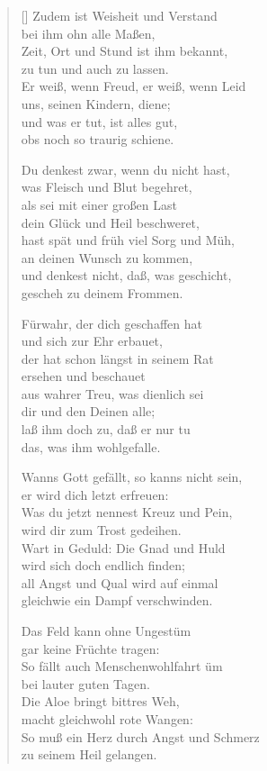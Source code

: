 \begin{multicols}{2}
\begin{verse}[\versewidth]
 Zudem ist Weisheit und Verstand\\
bei ihm ohn alle Maßen,\\
Zeit, Ort und Stund ist ihm bekannt,\\
zu tun und auch zu lassen.\\
Er weiß, wenn Freud, er weiß, wenn Leid\\
uns, seinen Kindern, diene;\\
und was er tut, ist alles gut,\\
obs noch so traurig schiene.

 Du denkest zwar, wenn du nicht hast,\\
was Fleisch und Blut begehret,\\
als sei mit einer großen Last\\
dein Glück und Heil beschweret,\\
hast spät und früh viel Sorg und Müh,\\
an deinen Wunsch zu kommen,\\
und denkest nicht, daß, was geschicht,\\
gescheh zu deinem Frommen.

 Fürwahr, der dich geschaffen hat\\
und sich zur Ehr erbauet,\\
der hat schon längst in seinem Rat\\
ersehen und beschauet\\
aus wahrer Treu, was dienlich sei\\
dir und den Deinen alle;\\
laß ihm doch zu, daß er nur tu\\
das, was ihm wohlgefalle.

 Wanns Gott gefällt, so kanns nicht sein,\\
er wird dich letzt erfreuen:\\
Was du jetzt nennest Kreuz und Pein,\\
wird dir zum Trost gedeihen.\\
Wart in Geduld: Die Gnad und Huld\\
wird sich doch endlich finden;\\
all Angst und Qual wird auf einmal\\
gleichwie ein Dampf verschwinden.

 Das Feld kann ohne Ungestüm\\
gar keine Früchte tragen:\\
So fällt auch Menschenwohlfahrt üm\\
bei lauter guten Tagen.\\
Die Aloe bringt bittres Weh,\\
macht gleichwohl rote Wangen:\\
So muß ein Herz durch Angst und Schmerz\\
zu seinem Heil gelangen.


\end{verse}
\end{multicols}
